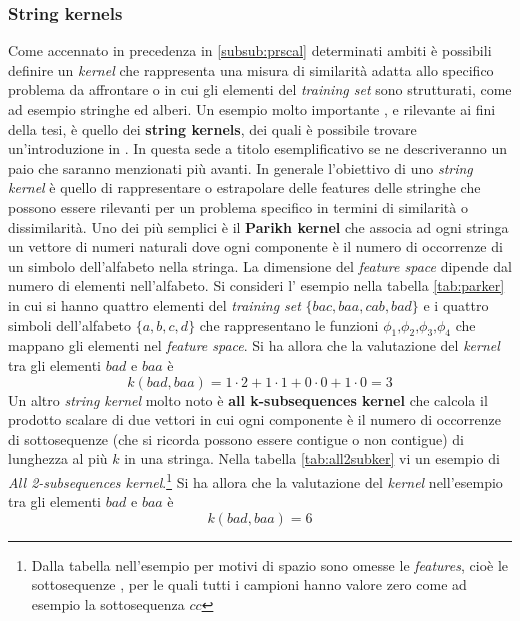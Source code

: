 \subsubsection{String kernels}
Come accennato in precedenza in \ref{subsub:prscal} determinati ambiti è possibili definire un \textit{kernel} che rappresenta una misura di similarità adatta allo specifico problema da affrontare o in cui gli elementi del \textit{training set} sono strutturati, come ad esempio stringhe ed alberi. Un esempio molto importante , e rilevante ai fini della tesi, è quello dei \textbf{string kernels}, dei quali  è possibile trovare un'introduzione in \cite[p. 60]{DeLaHiguera10}. In questa sede a titolo esemplificativo se ne descriveranno un paio che saranno menzionati più avanti. In generale l'obiettivo di uno \textit{string kernel} è quello di rappresentare o estrapolare delle features delle stringhe che possono essere rilevanti per un problema specifico in termini di similarità o dissimilarità. Uno dei più semplici è il \textbf{Parikh kernel} che associa ad ogni stringa un vettore di numeri naturali dove ogni componente è il numero di occorrenze di un simbolo dell'alfabeto nella stringa. La dimensione del \textit{feature space} dipende dal numero di elementi nell'alfabeto. Si consideri l' esempio nella tabella \ref{tab:parker} in cui si hanno quattro elementi del \textit{training set} $\{bac , baa , cab , bad\}$ e i quattro simboli dell'alfabeto $\{a,b,c,d\}$ che rappresentano le funzioni $\phi_{1}\text{,}\phi_{2}\text{,}\phi_{3}\text{,}\phi_{4}$ che mappano gli elementi nel \textit{feature space}. Si ha allora che la valutazione del \textit{kernel} tra gli elementi $bad \text{ e } baa$ è
\begin{equation*}
k(bad , baa) = 1\cdot2 + 1\cdot1 + 0\cdot0+1\cdot0 = 3
\end{equation*}
Un altro \textit{string kernel} molto noto è \textbf{all k-subsequences kernel} che calcola il prodotto scalare di due vettori in cui ogni componente è il numero di occorrenze di sottosequenze (che si ricorda possono essere contigue o non contigue) di lunghezza al più $k$ in una stringa. Nella tabella \ref{tab:all2subker} vi un esempio di \textit{All 2-subsequences kernel}.\footnote{Dalla tabella nell'esempio per motivi di spazio sono omesse le \textit{features}, cioè le sottosequenze , per le quali tutti i campioni hanno valore zero come ad esempio la sottosequenza $cc$} Si ha allora che la valutazione del \textit{kernel} nell'esempio tra gli elementi $bad \text{ e } baa$ è
\begin{equation*}
k(bad , baa) =  6
\end{equation*} 
